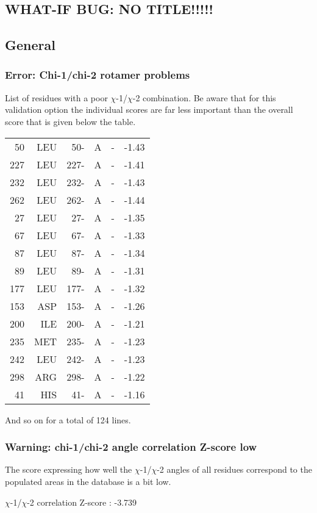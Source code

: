 \documentclass[a4paper]{article}
\def\showsect#1{
  \thesect\gdef\thesect{}
  \thessect\gdef\thessect{}
  \subsubsection{#1}
}
\gdef\thesect{\pagebreak[2]\section{WHAT-IF BUG: NO TITLE!!!!!}}
\gdef\thessect{\subsection{General}}
\begin{document}
\begin{error}
\showsect{Error: Chi-1/chi-2 rotamer problems}
List of residues with a poor $\chi$-1/$\chi$-2 combination. Be aware that for this
validation option the individual scores are far less important than the
overall score that is given below the table.
 
\begin{center}
 
\begin{supertabular}{rr@{ (}r@{) }rl@{ }r}
   50&LEU &  50-&A &-&   -1.43\\
  227&LEU & 227-&A &-&   -1.41\\
  232&LEU & 232-&A &-&   -1.43\\
  262&LEU & 262-&A &-&   -1.44\\
   27&LEU &  27-&A &-&   -1.35\\
   67&LEU &  67-&A &-&   -1.33\\
   87&LEU &  87-&A &-&   -1.34\\
   89&LEU &  89-&A &-&   -1.31\\
  177&LEU & 177-&A &-&   -1.32\\
  153&ASP & 153-&A &-&   -1.26\\
  200&ILE & 200-&A &-&   -1.21\\
  235&MET & 235-&A &-&   -1.23\\
  242&LEU & 242-&A &-&   -1.23\\
  298&ARG & 298-&A &-&   -1.22\\
   41&HIS &  41-&A &-&   -1.16\\
\end{supertabular}\end{center}
And so on for a total of   124 lines.
\end{error}

\begin{warning}
\showsect{Warning: chi-1/chi-2 angle correlation Z-score low}
The score expressing how well the $\chi$-1/$\chi$-2 angles of all residues
correspond to the populated areas in the database is
a bit low.
 
\parbox{1\textwidth}{
 $\chi$-1/$\chi$-2 correlation Z-score : -3.739
}%
 
\end{warning}
\end{document}
